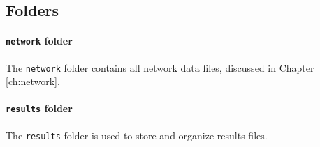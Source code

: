 \subsection{Folders}

\paragraph*{\texttt{network} folder}
The \texttt{network} folder contains all network data files, discussed in Chapter \ref{ch:network}.

\paragraph*{\texttt{results} folder}
The \texttt{results} folder is used to store and organize results files. 